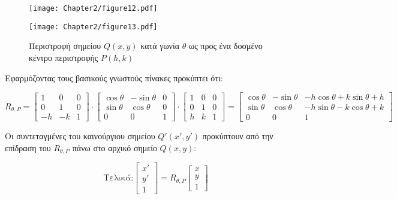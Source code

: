 \begin{solution}
\begin{figure}[h!]
	\begin{center}
		\begin{minipage}[b]{0.48\textwidth} %
		    \texttt{[image: Chapter2/figure12.pdf]}
		\end{minipage}%
	\hfill
		\begin{minipage}[b]{0.48\textwidth} %
			    \texttt{[image: Chapter2/figure13.pdf]}
		\end{minipage}
	\end{center}
	\caption{Περιστροφή σημείου $Q(x,y)$ κατά γωνία $\theta$ ως προς ένα δοσμένο κέντρο περιστροφής $P(h,k)$}
\end{figure}

Εφαρμόζοντας τους βασικούς γνωστούς πίνακες προκύπτει ότι:

\[
R_{\theta,P} =
\begin{bmatrix}
1 & 0 & 0 \\
0 & 1 & 0 \\
-h & -k & 1
\end{bmatrix}
\cdot
\begin{bmatrix}
\cos\theta & -\sin\theta & 0 \\
\sin\theta & \cos\theta & 0 \\
0 & 0 & 1
\end{bmatrix}
\cdot
\begin{bmatrix}
1 & 0 & 0 \\
0 & 1 & 0 \\
h & k & 1
\end{bmatrix}
=
\begin{bmatrix}
\cos\theta & -\sin\theta & -h\cos\theta + k\sin\theta + h \\
\sin\theta & \cos\theta & -h\sin\theta - k\cos\theta + k \\
0 & 0 & 1
\end{bmatrix}
\]

Οι συντεταγμένες του καινούργιου σημείου $Q'(x', y')$ προκύπτουν από την επίδραση του $R_{\theta,P}$ πάνω στο αρχικό σημείο $Q(x, y)$:

\[
\text{Τελικά:}
\begin{bmatrix}
x' \\ y' \\ 1
\end{bmatrix}
=
R_{\theta,P}
\begin{bmatrix}
x \\ y \\ 1
\end{bmatrix}
\]
\end{solution}